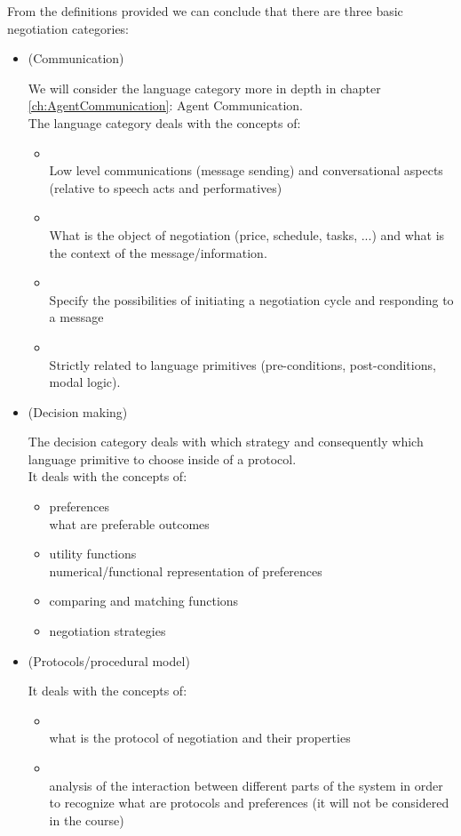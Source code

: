 From the definitions provided we can conclude that there are three basic negotiation categories:
\begin{itemize}
\item {} (Communication)

We will consider the language category more in depth in chapter \ref{ch:AgentCommunication}: Agent Communication.\\
The language category deals with the concepts of:
\begin{itemize}
\item {}\\
Low level communications (message sending) and conversational aspects (relative to speech acts and performatives)
\item {}\\
What is the object of negotiation (price, schedule, tasks, ...) and what is the context of the message/information.
\item {}\\
Specify the possibilities of initiating a negotiation cycle and responding to a message
\item {}\\
Strictly related to language primitives (pre-conditions, post-conditions, modal logic).
\end{itemize}

\item {} (Decision making)

The decision category deals with which strategy and consequently which language primitive to choose inside of a protocol.\\
It deals with the concepts of:
\begin{itemize}
\item preferences\\ 
what are preferable outcomes
\item utility functions\\
 numerical/functional representation of preferences
\item comparing and matching functions
\item negotiation strategies
\end{itemize}

\item {} (Protocols/procedural model)

It deals with the concepts of:
\begin{itemize}
\item {}\\
what is the protocol of negotiation and their properties
\item {}\\
analysis of the interaction between different parts of the system in order to recognize what are protocols and preferences (it will not be considered in the course)
\end{itemize}
\end{itemize}

